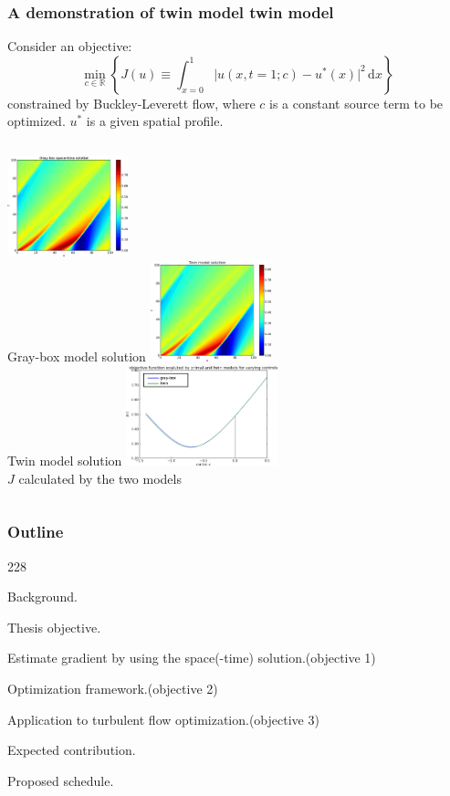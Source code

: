 \documentclass{beamer}
\let\oldcite=\cite
\renewcommand{\cite}[1]{\textcolor[rgb]{.4,.4,.85}{\oldcite{#1}}}
\newcommand{\barrow}{\item[\color{darkred}\ding{228}]}
\begin{document}
\begin{frame}
    \frametitle{A demonstration of twin model \hfill \scriptsize{twin model}}\small
    Consider an objective: \scriptsize \cite{Kucuk 06}\vspace{-.2cm}\small
    $$
        \min_{c\in\mathbb{R}} \left\{ J(u) \equiv \int_{x=0}^1 \big|u(x,t=1;c) - u^*(x)\big|^2 \,\textrm{d}x\right\}
    $$
    constrained by Buckley-Leverett flow, where $c$ is a constant source term to be optimized.
    $u^*$ is a given spatial profile.\\\vspace{.2cm}
    \scriptsize
    \begin{columns}
         \centering
            \includegraphics[width=3.5cm]{leftcol.png}\\
            Gray-box model solution
         \centering
            \includegraphics[width=3.5cm]{Twin_sol_30.png}\\
            Twin model solution
         \centering
            \includegraphics[width=4.4cm]{J_twin_vs_primal.png}\\
            $J$ calculated by the two models
    \end{columns}
\end{frame}


\begin{frame}
    \frametitle{Outline}\small
    \begin{dinglist}{228}
        \barrow {} Background.
        \barrow Thesis objective.
        \vspace{.35cm}
        \barrow Estimate gradient by using the space(-time) solution.\hfill(objective 1)
        \barrow Optimization framework.\hfill(objective 2)
        \barrow Application to turbulent flow optimization.\hfill(objective 3)
        \vspace{.35cm}
        \barrow Expected contribution.
        \barrow Proposed schedule.
    \end{dinglist}
\end{frame}
\end{document}
